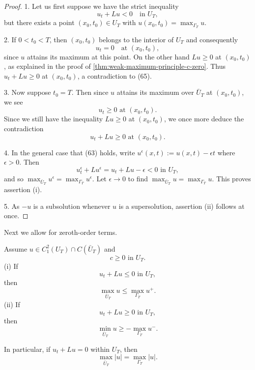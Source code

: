 \begin{proof}
1. Let us first suppose we have the strict inequality
\[
u_t + Lu < 0 \quad \text{in } U_T,
\tag{65}
\]
but there exists a point $(x_0, t_0) \in U_T$ with $u(x_0, t_0) = \max_{\Gamma_T} u$.

2. If $0 < t_0 < T$, then $(x_0, t_0)$ belongs to the interior of $U_T$ and consequently
\[
u_t = 0 \quad \text{at } (x_0, t_0),
\tag{66}
\]
since $u$ attains its maximum at this point. On the other hand $Lu \geq 0$ at $(x_0,t_0)$, as explained in the proof of \cref{thm:weak-maximum-principle-c-zero}. Thus $u_t + Lu \geq 0$ at $(x_0,t_0)$, a contradiction to (65).

3. Now suppose $t_0 = T$. Then since $u$ attains its maximum over $\bar{U}_T$ at $(x_0,t_0)$, we see
\[
u_t \geq 0 \text{ at } (x_0,t_0).
\]
Since we still have the inequality $Lu \geq 0$ at $(x_0,t_0)$, we once more deduce the contradiction
\[
u_t + Lu \geq 0 \text{ at } (x_0,t_0).
\]

4. In the general case that (63) holds, write $u^\epsilon(x,t) := u(x,t) - \epsilon t$ where $\epsilon > 0$. Then
\[
u_t^\epsilon + Lu^\epsilon = u_t + Lu - \epsilon < 0 \text{ in } U_T,
\]
and so $\max_{\bar U_T} u^\epsilon = \max_{\Gamma_T} u^\epsilon$. Let $\epsilon \to 0$ to find $\max_{\bar U_T} u = \max_{\Gamma_T} u$. This proves assertion (i).

5. As $-u$ is a subsolution whenever $u$ is a supersolution, assertion (ii) follows at once.
\end{proof}

Next we allow for zeroth-order terms.

\begin{theorem}
\label{thm:parabolic-weak-maximum-principle-c-nonneg}
Assume $u \in C_1^2(U_T) \cap C(\bar{U}_T)$ and
\[
c \geq 0 \text{ in } U_T.
\]
(i) If
\[
u_t + Lu \leq 0 \text{ in } U_T,
\]
then
\[
\max_{\bar{U}_T} u \leq \max_{\Gamma_T} u^+.
\]
(ii) If
\[
u_t + Lu \geq 0 \text{ in } U_T,
\]
then
\[
\min_{\bar{U}_T} u \geq - \max_{\Gamma_T} u^-.
\]
\end{theorem}

\begin{remark}
\label{rem:parabolic-weak-max-principle-abs-value}
In particular, if $u_t + Lu = 0$ within $U_T$, then
\[
\max_{\bar{U}_T} |u| = \max_{\Gamma_T} |u|.
\]
\end{remark}

